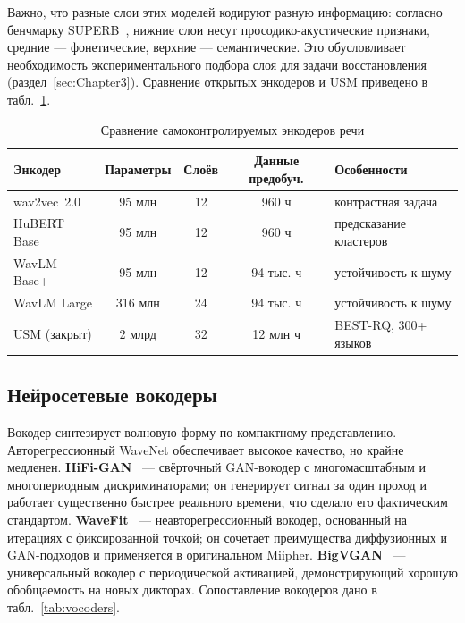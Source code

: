 Важно, что разные слои этих моделей кодируют разную информацию: согласно
бенчмарку SUPERB~\cite{superb}, нижние слои несут просодико-акустические
признаки, средние --- фонетические, верхние --- семантические. Это
обусловливает необходимость экспериментального подбора слоя для задачи
восстановления (раздел~\ref{sec:Chapter3}). Сравнение открытых энкодеров и USM
приведено в табл.~\ref{tab:encoders}.

\begin{table}[H]
    \caption{Сравнение самоконтролируемых энкодеров речи}
    \label{tab:encoders}
    \centering
    \footnotesize
    \begin{tabularx}{\textwidth}{l c c c X}
        \toprule
        Энкодер & Параметры & Слоёв & Данные предобуч. & Особенности \\
        \midrule
        wav2vec~2.0 & 95 млн & 12 & 960 ч & контрастная задача \\
        HuBERT Base & 95 млн & 12 & 960 ч & предсказание кластеров \\
        WavLM Base+ & 95 млн & 12 & 94 тыс. ч & устойчивость к шуму \\
        WavLM Large & 316 млн & 24 & 94 тыс. ч & устойчивость к шуму \\
        USM (закрыт) & 2 млрд & 32 & 12 млн ч & BEST-RQ, 300+ языков \\
        \bottomrule
    \end{tabularx}
\end{table}

\subsection{Нейросетевые вокодеры}

Вокодер синтезирует волновую форму по компактному представлению.
Авторегрессионный WaveNet обеспечивает высокое качество, но крайне медленен.
\textbf{HiFi-GAN}~\cite{hifigan} --- свёрточный GAN-вокодер с многомасштабным и
многопериодным дискриминаторами; он генерирует сигнал за один проход и работает
существенно быстрее реального времени, что сделало его фактическим стандартом.
\textbf{WaveFit}~\cite{wavefit} --- неавторегрессионный вокодер, основанный на
итерациях с фиксированной точкой; он сочетает преимущества диффузионных и
GAN-подходов и применяется в оригинальном Miipher. \textbf{BigVGAN}~\cite{bigvgan}
--- универсальный вокодер с периодической активацией, демонстрирующий хорошую
обобщаемость на новых дикторах. Сопоставление вокодеров дано в
табл.~\ref{tab:vocoders}.

